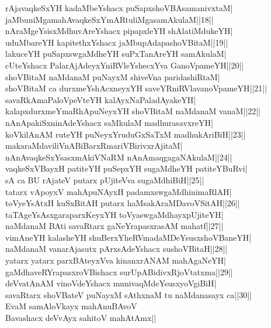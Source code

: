 \documentclass{article}
\begin{document}
rAjavaqkeSxYH kadaMbeYshacx puSapxshoVBAsamanivxtaM|\\
jaMbuniMgamahAvaqkeSxYmARtuliMgasamAkulaM||18||\\
nAraMgeYsisxMdhuvAreYshacx pipapxleYH shAlatiMdukeYH|\\
uduMbareYH kapitethxYshacx jaMbupAdapashoVBitaM||19||\\
lakuceYH puSapxswgaMdheYH suPxTanAreYH samAkulaM|\\
cUteYshacx PalarAjAdeyxYniRVleYshecxYva GanoVpameYH||20||\\
shoVBitaM naMdanaM puNayxM shiveVna paridashiRtaM|\\
shoVBitaM ca durxmeYshAcxneyxYH saveYRniRVlavanoVpameYH||21||\\
savaRkAmaPaloVpeVteYH kalAyxNaPaladAyakeYH|\\
kalapxdurxmeYmaRhApuNeyxYH shoVBitaM naMdanaM vanaM||22||\\
nAnApakiSxninAdeYshacx saMkulaM madhurasavxreYH|\\
koVkilAnAM ruteYH puNeyxYruduGxSaTxM madhukAriBiH||23||\\
makaraMdaviliVnABiBarxRmariVBirivxrAjitaM|\\
nAnAvaqkeSxYsasxmAkiVNaRM nAnAmaqgagaNAkulaM||24||\\
vaqkeSxVBayxH patiteYH puSepxYH sugaMdheYH patiteYBuRvi|\\
sA ca BU rAjateV putarx pUjiteVva sugaMdhiBiH||25||\\
tatarx vApoyxV mahApuNAyxH padamxswgaMdhinimaRlAH|\\
toVyeYsAtxH kuSxBitAH putarx haMsakAraMDavoVSitAH||26||\\
taTAgeYsAsxgaraparxKeyxYH toVyaswgaMdhayxpUjiteYH|\\
naMdanaM BAti savaRtarx gaNeYrapasxrasAM mahatf||27||\\
vimAneYH kalasheYH shuBerxYheRVmadaMDeYsusxshoVBaneYH|\\
naMdanaM vanarAjasutx pArxsAdeYshacx sushoVBitaH||28||\\
yatarx yatarx parxBAteyxVva kinanxrANAM mahAgaNeYH|\\
gaMdhaveRYrapasxroVBishacx surUpABidivxRjoVtatxma||29||\\
deVvatAnAM vinoVdeYshacx munivaqMdeYsusxyoVgiBiH|\\
savaRtarx shoVBateV puNayxM sAthxnaM tu naMdanasayx ca||30||\\
EvaM samAloVkayx mahAnuBAvoV\\
Bavashacx deVvAyx sahitoV mahAtAmx||\\
\end{document}

